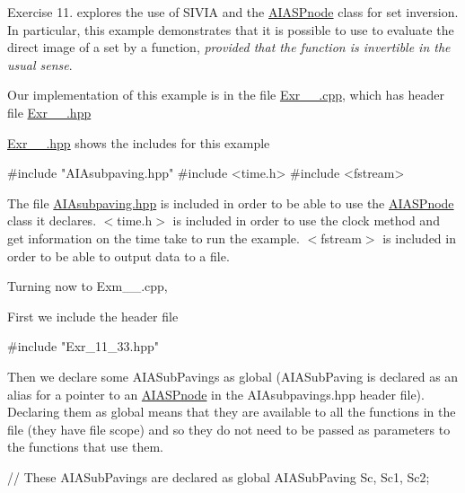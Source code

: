 \-Exercise 11. explores the use of \-S\-I\-V\-I\-A and the \hyperlink{classAIASPnode}{\-A\-I\-A\-S\-Pnode} class for set inversion. \-In particular, this example demonstrates that it is possible to use to evaluate the direct image of a set by a function, {\itshape provided that the function is invertible in the usual sense\/}.

\-Our implementation of this example is in the file \hyperlink{Exr__11__33_8cpp}{\-Exr\-\_\-\_.\-cpp}, which has header file \hyperlink{Exr__11__33_8hpp}{\-Exr\-\_\-\_.\-hpp}

\hyperlink{Exr__11__33_8hpp}{\-Exr\-\_\-\_.\-hpp} shows the includes for this example




\begin{DoxyCodeInclude}
#include "AIAsubpaving.hpp"
#include <time.h>
#include <fstream>

\end{DoxyCodeInclude}


\-The file \hyperlink{AIAsubpaving_8hpp}{\-A\-I\-Asubpaving.\-hpp} is included in order to be able to use the \hyperlink{classAIASPnode}{\-A\-I\-A\-S\-Pnode} class it declares. $<$time.\-h$>$ is included in order to use the clock method and get information on the time take to run the example. $<$fstream$>$ is included in order to be able to output data to a file.

\-Turning now to \-Exm\-\_\-\_.\-cpp,



\-First we include the header file


\begin{DoxyCodeInclude}
#include "Exr_11_33.hpp"

\end{DoxyCodeInclude}


\-Then we declare some \-A\-I\-A\-Sub\-Pavings as global (\-A\-I\-A\-Sub\-Paving is declared as an alias for a pointer to an \hyperlink{classAIASPnode}{\-A\-I\-A\-S\-Pnode} in the \-A\-I\-Asubpavings.\-hpp header file). \-Declaring them as global means that they are available to all the functions in the file (they have file scope) and so they do not need to be passed as parameters to the functions that use them.


\begin{DoxyCodeInclude}
// These AIASubPavings are declared as global
AIASubPaving Sc, Sc1, Sc2;

\end{DoxyCodeInclude}


